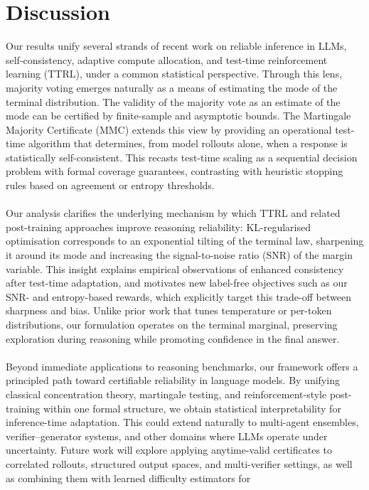 \documentclass{article} %
\begin{document}
\section{Discussion}\label{sec:discussion}
Our results unify several strands of recent work on reliable inference in LLMs, self-consistency,
adaptive compute allocation, and test-time reinforcement learning (TTRL), under a common
statistical perspective.  Through this lens, majority voting emerges naturally as a means of estimating the mode of the terminal distribution.  The validity of the majority vote as an estimate of the mode can be  {certified} by finite-sample and asymptotic bounds. The Martingale Majority Certificate (MMC)
extends this view by providing an {operational} test-time algorithm that determines, from model
rollouts alone, when a response is statistically self-consistent.  This recasts test-time scaling as a sequential decision problem with formal coverage guarantees, contrasting with heuristic
stopping rules based on agreement or entropy thresholds.
\\\\
Our analysis clarifies the underlying mechanism by which TTRL and related post-training
approaches improve reasoning reliability: KL-regularised optimisation corresponds to an
{exponential tilting} of the terminal law, sharpening it around its mode and increasing the
signal-to-noise ratio (SNR) of the margin variable.  This insight explains empirical observations of
enhanced consistency after test-time adaptation, and motivates new label-free objectives such as
our SNR- and entropy-based rewards, which explicitly target this trade-off between sharpness and
bias.  Unlike prior work that tunes temperature or per-token distributions, our formulation operates
on the terminal marginal, preserving exploration during reasoning while promoting confidence in the
final answer.
\\\\
Beyond immediate applications to reasoning benchmarks, our framework offers a principled path
toward {certifiable reliability} in language models.  By unifying classical concentration theory,
martingale testing, and reinforcement-style post-training within one formal structure, we obtain
statistical interpretability for inference-time adaptation.  This could extend naturally to multi-agent
ensembles, verifier–generator systems, and other domains where LLMs operate under uncertainty.
Future work will explore applying anytime-valid certificates to correlated rollouts, structured output
spaces, and multi-verifier settings, as well as combining them with learned difficulty estimators for
\end{document}

